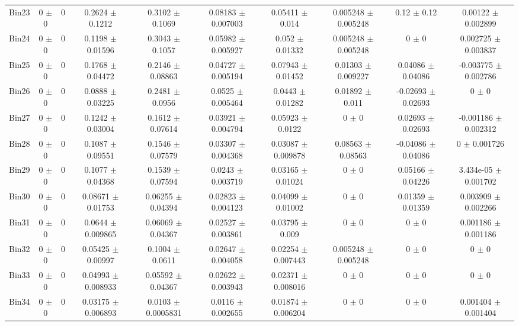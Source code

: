\begin{tabular}{@{\extracolsep{4pt}}lccccccccc@{}}
     Bin23 & 0 $\pm$ 0 & 0 & 0.2624 $\pm$ 0.1212 & 0.3102 $\pm$ 0.1069 & 0.08183 $\pm$ 0.007003 & 0.05411 $\pm$ 0.014 & 0.005248 $\pm$ 0.005248 & 0.12 $\pm$ 0.12 & 0.00122 $\pm$ 0.002899 \\ 
     Bin24 & 0 $\pm$ 0 & 0 & 0.1198 $\pm$ 0.01596 & 0.3043 $\pm$ 0.1057 & 0.05982 $\pm$ 0.005927 & 0.052 $\pm$ 0.01332 & 0.005248 $\pm$ 0.005248 & 0 $\pm$ 0 & 0.002725 $\pm$ 0.003837 \\ 
     Bin25 & 0 $\pm$ 0 & 0 & 0.1768 $\pm$ 0.04472 & 0.2146 $\pm$ 0.08863 & 0.04727 $\pm$ 0.005194 & 0.07943 $\pm$ 0.01452 & 0.01303 $\pm$ 0.009227 & 0.04086 $\pm$ 0.04086 & -0.003775 $\pm$ 0.002786 \\ 
     Bin26 & 0 $\pm$ 0 & 0 & 0.0888 $\pm$ 0.03225 & 0.2481 $\pm$ 0.0956 & 0.0525 $\pm$ 0.005464 & 0.0443 $\pm$ 0.01282 & 0.01892 $\pm$ 0.011 & -0.02693 $\pm$ 0.02693 & 0 $\pm$ 0 \\ 
     Bin27 & 0 $\pm$ 0 & 0 & 0.1242 $\pm$ 0.03004 & 0.1612 $\pm$ 0.07614 & 0.03921 $\pm$ 0.004794 & 0.05923 $\pm$ 0.0122 & 0 $\pm$ 0 & 0.02693 $\pm$ 0.02693 & -0.001186 $\pm$ 0.002312 \\ 
     Bin28 & 0 $\pm$ 0 & 0 & 0.1087 $\pm$ 0.09551 & 0.1546 $\pm$ 0.07579 & 0.03307 $\pm$ 0.004368 & 0.03087 $\pm$ 0.009878 & 0.08563 $\pm$ 0.08563 & -0.04086 $\pm$ 0.04086 & 0 $\pm$ 0.001726 \\ 
     Bin29 & 0 $\pm$ 0 & 0 & 0.1077 $\pm$ 0.04368 & 0.1539 $\pm$ 0.07594 & 0.0243 $\pm$ 0.003719 & 0.03165 $\pm$ 0.01024 & 0 $\pm$ 0 & 0.05166 $\pm$ 0.04226 & 3.434e-05 $\pm$ 0.001702 \\ 
     Bin30 & 0 $\pm$ 0 & 0 & 0.08671 $\pm$ 0.01753 & 0.06255 $\pm$ 0.04394 & 0.02823 $\pm$ 0.004123 & 0.04099 $\pm$ 0.01002 & 0 $\pm$ 0 & 0.01359 $\pm$ 0.01359 & 0.003909 $\pm$ 0.002266 \\ 
     Bin31 & 0 $\pm$ 0 & 0 & 0.0644 $\pm$ 0.009865 & 0.06069 $\pm$ 0.04367 & 0.02527 $\pm$ 0.003861 & 0.03795 $\pm$ 0.009 & 0 $\pm$ 0 & 0 $\pm$ 0 & 0.001186 $\pm$ 0.001186 \\ 
     Bin32 & 0 $\pm$ 0 & 0 & 0.05425 $\pm$ 0.00997 & 0.1004 $\pm$ 0.0611 & 0.02647 $\pm$ 0.004058 & 0.02254 $\pm$ 0.007443 & 0.005248 $\pm$ 0.005248 & 0 $\pm$ 0 & 0 $\pm$ 0 \\ 
     Bin33 & 0 $\pm$ 0 & 0 & 0.04993 $\pm$ 0.008933 & 0.05592 $\pm$ 0.04367 & 0.02622 $\pm$ 0.003943 & 0.02371 $\pm$ 0.008016 & 0 $\pm$ 0 & 0 $\pm$ 0 & 0 $\pm$ 0 \\ 
     Bin34 & 0 $\pm$ 0 & 0 & 0.03175 $\pm$ 0.006893 & 0.0103 $\pm$ 0.0005831 & 0.0116 $\pm$ 0.002655 & 0.01874 $\pm$ 0.006204 & 0 $\pm$ 0 & 0 $\pm$ 0 & 0.001404 $\pm$ 0.001404 \\ 

\end{tabular}
